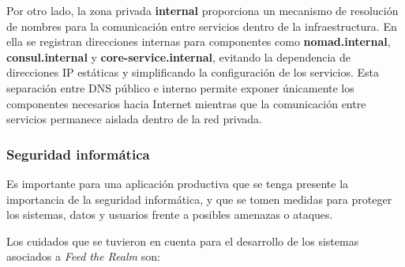 Por otro lado, la zona privada \textbf{internal} proporciona un mecanismo de resolución de nombres para la comunicación entre servicios dentro de la infraestructura.
En ella se registran direcciones internas para componentes como \textbf{nomad.internal}, \textbf{consul.internal} y \textbf{core-service.internal},
evitando la dependencia de direcciones IP estáticas y simplificando la configuración de los servicios.
Esta separación entre DNS público e interno permite exponer únicamente los componentes necesarios hacia Internet mientras que la comunicación entre servicios permanece 
aislada dentro de la red privada.

\subsubsection{Seguridad informática}

Es importante para una aplicación productiva que se tenga presente la importancia de la seguridad informática,
y que se tomen medidas para proteger los sistemas, datos y usuarios frente a posibles amenazas o ataques.

Los cuidados que se tuvieron en cuenta para el desarrollo de los sistemas asociados a \textit{Feed the Realm} son:

